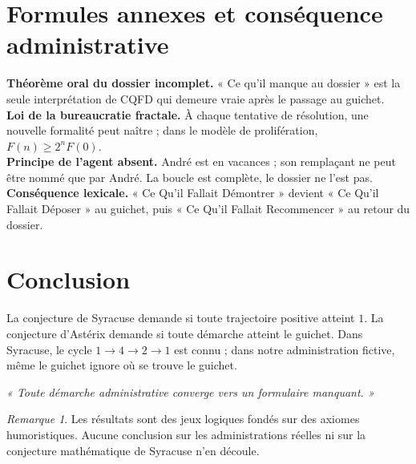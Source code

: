 \documentclass[11pt,a4paper]{article}
\theoremstyle{remark}\newtheorem*{remarque}{Remarque}
\begin{document}
\section{Formules annexes et conséquence administrative}
\noindent\textbf{Théorème oral du dossier incomplet.} « Ce qu'il manque au dossier » est la seule interprétation de CQFD qui demeure vraie après le passage au guichet.\\[.5em]
\noindent\textbf{Loi de la bureaucratie fractale.} À chaque tentative de résolution, une nouvelle formalité peut naître ; dans le modèle de prolifération, $F(n)\geq 2^nF(0)$.\\[.5em]
\noindent\textbf{Principe de l'agent absent.} André est en vacances ; son remplaçant ne peut être nommé que par André. La boucle est complète, le dossier ne l'est pas.\\[.5em]
\noindent\textbf{Conséquence lexicale.} « Ce Qu'il Fallait Démontrer » devient « Ce Qu'il Fallait Déposer » au guichet, puis « Ce Qu'il Fallait Recommencer » au retour du dossier.
\section{Conclusion}
La conjecture de Syracuse demande si toute trajectoire positive atteint $1$. La conjecture d'Astérix demande si toute démarche atteint le guichet. Dans Syracuse, le cycle $1\to4\to2\to1$ est connu ; dans notre administration fictive, même le guichet ignore où se trouve le guichet.
\begin{center}\textcolor{or}{\large\itshape « Toute démarche administrative converge vers un formulaire manquant. »}\end{center}
\begin{remarque}
Les résultats sont des jeux logiques fondés sur des axiomes humoristiques. Aucune conclusion sur les administrations réelles ni sur la conjecture mathématique de Syracuse n'en découle.
\end{remarque}
\end{document}
